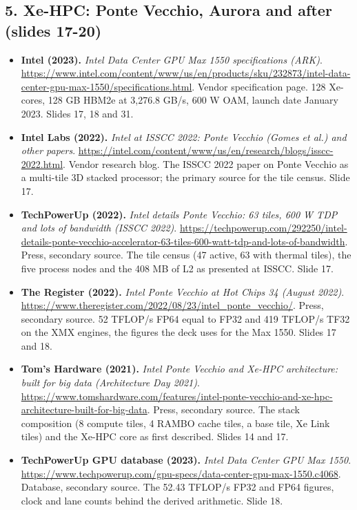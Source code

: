 \subsection*{5. Xe-HPC: Ponte Vecchio, Aurora and after (slides 17-20)}
\begin{itemize}[leftmargin=1.2em,itemsep=3pt]\sloppy
\item \textbf{Intel (2023).} \textit{Intel Data Center GPU Max 1550 specifications (ARK)}. \url{https://www.intel.com/content/www/us/en/products/sku/232873/intel-data-center-gpu-max-1550/specifications.html}. Vendor specification page. 128 Xe-cores, 128 GB HBM2e at 3,276.8 GB/s, 600 W OAM, launch date January 2023. Slides 17, 18 and 31.
\item \textbf{Intel Labs (2022).} \textit{Intel at ISSCC 2022: Ponte Vecchio (Gomes et al.) and other papers}. \url{https://intel.com/content/www/us/en/research/blogs/isscc-2022.html}. Vendor research blog. The ISSCC 2022 paper on Ponte Vecchio as a multi-tile 3D stacked processor; the primary source for the tile census. Slide 17.
\item \textbf{TechPowerUp (2022).} \textit{Intel details Ponte Vecchio: 63 tiles, 600 W TDP and lots of bandwidth (ISSCC 2022)}. \url{https://techpowerup.com/292250/intel-details-ponte-vecchio-accelerator-63-tiles-600-watt-tdp-and-lots-of-bandwidth}. Press, secondary source. The tile census (47 active, 63 with thermal tiles), the five process nodes and the 408 MB of L2 as presented at ISSCC. Slide 17.
\item \textbf{The Register (2022).} \textit{Intel Ponte Vecchio at Hot Chips 34 (August 2022)}. \url{https://www.theregister.com/2022/08/23/intel_ponte_vecchio/}. Press, secondary source. 52 TFLOP/s FP64 equal to FP32 and 419 TFLOP/s TF32 on the XMX engines, the figures the deck uses for the Max 1550. Slides 17 and 18.
\item \textbf{Tom's Hardware (2021).} \textit{Intel Ponte Vecchio and Xe-HPC architecture: built for big data (Architecture Day 2021)}. \url{https://www.tomshardware.com/features/intel-ponte-vecchio-and-xe-hpc-architecture-built-for-big-data}. Press, secondary source. The stack composition (8 compute tiles, 4 RAMBO cache tiles, a base tile, Xe Link tiles) and the Xe-HPC core as first described. Slides 14 and 17.
\item \textbf{TechPowerUp GPU database (2023).} \textit{Intel Data Center GPU Max 1550}. \url{https://www.techpowerup.com/gpu-specs/data-center-gpu-max-1550.c4068}. Database, secondary source. The 52.43 TFLOP/s FP32 and FP64 figures, clock and lane counts behind the derived arithmetic. Slide 18.

\end{itemize}
